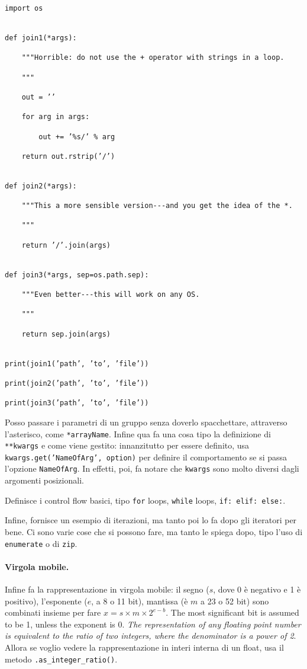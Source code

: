 \documentclass[10pt, a4paper, titlepage]{book}
\begin{document}
\begin{verbatim}
import os


def join1(*args):

	"""Horrible: do not use the + operator with strings in a loop.

	"""

	out = ’’

	for arg in args:

		out += ’%s/’ % arg

	return out.rstrip(’/’)


def join2(*args):

	"""This a more sensible version---and you get the idea of the *.

	"""

	return ’/’.join(args)


def join3(*args, sep=os.path.sep):

	"""Even better---this will work on any OS.

	"""

	return sep.join(args)


print(join1(’path’, ’to’, ’file’))

print(join2(’path’, ’to’, ’file’))

print(join3(’path’, ’to’, ’file’))
\end{verbatim}

Posso passare i parametri di un gruppo senza doverlo spacchettare, attraverso l'asterisco, come \texttt{*arrayName}.
Infine qua fa una cosa tipo la definizione di \texttt{**kwargs} e come viene gestito: innanzitutto per essere definito, usa \texttt{kwargs.get('NameOfArg', option)} per definire il comportamento se si passa l'opzione \texttt{NameOfArg}. In effetti, poi, fa notare che \texttt{kwargs} sono molto diversi dagli argomenti posizionali.

Definisce i control flow basici, tipo \texttt{for} loops, \texttt{while} loops, \texttt{if: elif: else:}.

Infine, fornisce un esempio di iterazioni, ma tanto poi lo fa dopo gli iteratori per bene. Ci sono varie cose che si possono fare, ma tanto le spiega dopo, tipo l'uso di \texttt{enumerate} o di \texttt{zip}.

\paragraph{Virgola mobile.} Infine fa la rappresentazione in virgola mobile: il segno ($s$, dove 0 è negativo e 1 è positivo), l'esponente ($e$, a 8 o 11 bit), mantissa (è $m$ a 23 o 52 bit) sono combinati insieme per fare $x=s\times m\times 2^{e-b}$. 
The most significant bit is assumed to be 1, unless the exponent is 0.
\textit{The representation of any floating point number is equivalent to
the ratio of two integers, where the denominator is a power of 2}.
Allora se voglio vedere la rappresentazione in interi interna di un float, usa il metodo \texttt{.as\_integer\_ratio()}.
\end{document}
